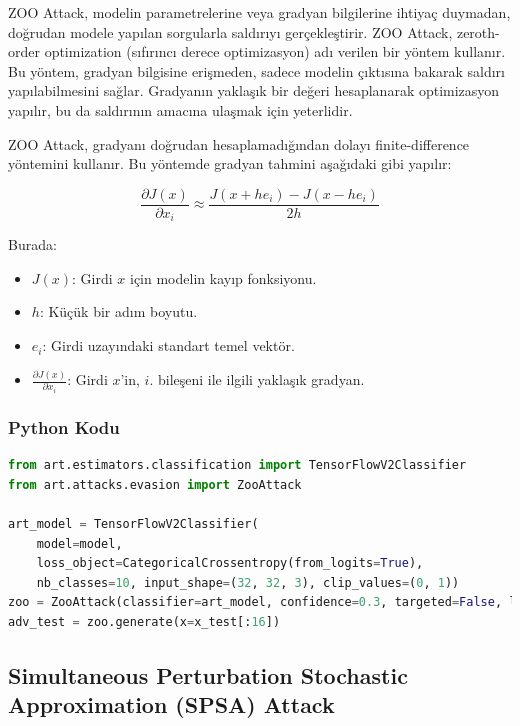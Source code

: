 ZOO Attack, modelin parametrelerine veya gradyan bilgilerine ihtiyaç duymadan, doğrudan modele yapılan sorgularla saldırıyı gerçekleştirir. ZOO Attack, zeroth-order optimization (sıfırıncı derece optimizasyon) adı verilen bir yöntem kullanır. Bu yöntem, gradyan bilgisine erişmeden, sadece modelin çıktısına bakarak saldırı yapılabilmesini sağlar. Gradyanın yaklaşık bir değeri hesaplanarak optimizasyon yapılır, bu da saldırının amacına ulaşmak için yeterlidir.

ZOO Attack, gradyanı doğrudan hesaplamadığından dolayı finite-difference yöntemini kullanır. Bu yöntemde gradyan tahmini aşağıdaki gibi yapılır:

\[ \frac{\partial J(x)}{\partial x_i} \approx \frac{J(x + h e_i) - J(x - h e_i)}{2h} \]

Burada:

\begin{itemize}
    \item $J(x)$: Girdi $x$ için modelin kayıp fonksiyonu.
    \item $h$: Küçük bir adım boyutu.
    \item $e_i$: Girdi uzayındaki standart temel vektör.
    \item $\frac{\partial J(x)}{\partial x_i}$: Girdi $x$'in, $i$. bileşeni ile ilgili yaklaşık gradyan.
\end{itemize}

\subsubsection{Python Kodu}

\begin{lstlisting}[language=Python]
from art.estimators.classification import TensorFlowV2Classifier
from art.attacks.evasion import ZooAttack

art_model = TensorFlowV2Classifier(
    model=model, 
    loss_object=CategoricalCrossentropy(from_logits=True),
    nb_classes=10, input_shape=(32, 32, 3), clip_values=(0, 1))
zoo = ZooAttack(classifier=art_model, confidence=0.3, targeted=False, learning_rate=0.1)
adv_test = zoo.generate(x=x_test[:16])
\end{lstlisting}

\newpage

\subsection{Simultaneous Perturbation Stochastic Approximation (SPSA) Attack}

